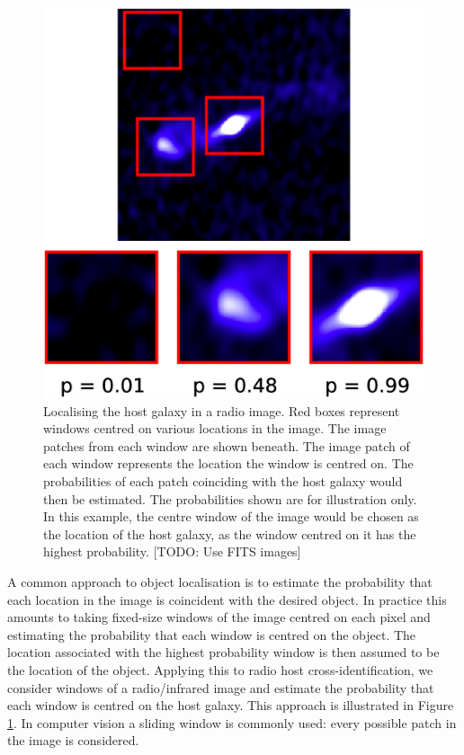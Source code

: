 \documentclass[fleqn,usenatbib,usedcolumn]{mnras}
\begin{document}
    \begin{figure}
      \centering
      \includegraphics[width=0.8\columnwidth]{images/windows.eps}
      \caption{Localising the host galaxy in a radio image. Red boxes
        represent windows centred on various locations in the image. The image
        patches from each window are shown beneath. The image patch of each
        window represents the location the window is centred on. The
        probabilities of each patch coinciding with the host galaxy would then
        be estimated. The probabilities shown are for illustration only. In
        this example, the centre window of the image would be chosen as the
        location of the host galaxy, as the window centred on it has the
        highest probability. [TODO: Use FITS images]}
      \label{fig:windows}
    \end{figure}

    A common approach to object localisation is to estimate the probability
    that each location in the image is coincident with the desired object. In
    practice this amounts to taking fixed-size windows of the image centred on
    each pixel and estimating the probability that each window is centred on
    the object. The location associated with the highest probability window is
    then assumed to be the location of the object. Applying this to radio host
    cross-identification, we consider windows of a radio/infrared image and
    estimate the probability that each window is centred on the host galaxy.
    This approach is illustrated in Figure \ref{fig:windows}.
    In computer vision a sliding window is commonly used: every possible patch
    in the image is considered.
\end{document}
